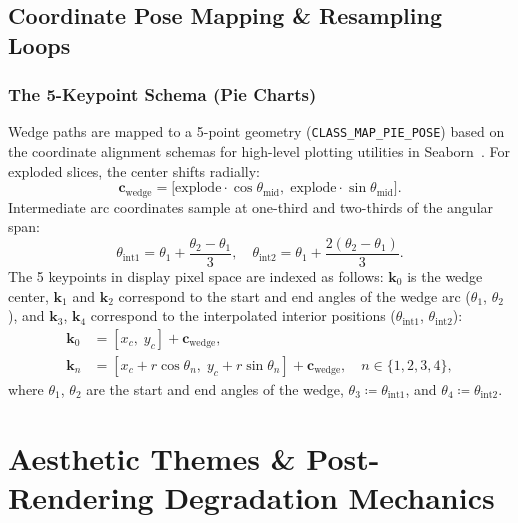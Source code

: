 \documentclass[11pt,twocolumn]{article}
\begin{document}
\subsection{Coordinate Pose Mapping \& Resampling Loops}\label{sec:pose}

\subsubsection{The 5-Keypoint Schema (Pie Charts)}\label{sec:5kpt}

Wedge paths are mapped to a 5-point geometry (\texttt{CLASS\_MAP\_PIE\_POSE}) based on the coordinate alignment schemas for high-level plotting utilities in Seaborn~\cite{waskom2021seaborn}. For exploded slices, the center shifts radially:
\begin{equation}\label{eq:wedge_center}
  \mathbf{c}_{\text{wedge}} = \bigl[\text{explode}\cdot\cos\theta_{\text{mid}},\;\text{explode}\cdot\sin\theta_{\text{mid}}\bigr].
\end{equation}
Intermediate arc coordinates sample at one-third and two-thirds of the angular span:
\begin{equation}\label{eq:arc_interp}
  \theta_{\text{int1}} = \theta_1 + \frac{\theta_2-\theta_1}{3},\quad \theta_{\text{int2}} = \theta_1 + \frac{2(\theta_2-\theta_1)}{3}.
\end{equation}
The 5 keypoints in display pixel space are indexed as follows: $\mathbf{k}_0$ is the wedge center, $\mathbf{k}_1$ and $\mathbf{k}_2$ correspond to the start and end angles of the wedge arc ($\theta_1$, $\theta_2$), and $\mathbf{k}_3$, $\mathbf{k}_4$ correspond to the interpolated interior positions ($\theta_{\text{int1}}$, $\theta_{\text{int2}}$):
\begin{align}
  \mathbf{k}_0 &= [x_c,\; y_c] + \mathbf{c}_{\text{wedge}}, \label{eq:k0}\\
  \mathbf{k}_n &= [x_c + r\cos\theta_n,\; y_c + r\sin\theta_n] + \mathbf{c}_{\text{wedge}}, \quad n \in \{1,2,3,4\}, \label{eq:kn}
\end{align}
where $\theta_1$, $\theta_2$ are the start and end angles of the wedge, $\theta_3 \coloneqq \theta_{\text{int1}}$, and $\theta_4 \coloneqq \theta_{\text{int2}} $.

\section{Aesthetic Themes \& Post-Rendering Degradation Mechanics}\label{sec:themes}
\end{document}

